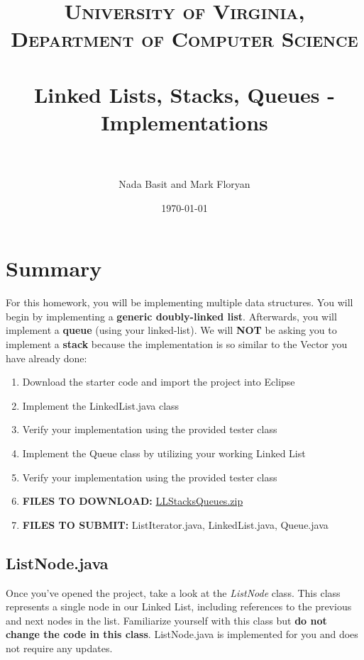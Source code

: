 \documentclass[paper=a4, fontsize=11pt, parskip=full]{scrartcl} %
\title{
\normalfont \normalsize
\textsc{University of Virginia, Department of Computer Science} \\ [25pt] %
\horrule{0.5pt} \\[0.4cm] %
\huge Linked Lists, Stacks, Queues - Implementations \\ %
\horrule{2pt} \\[0.5cm] %
}
\author{Nada Basit and Mark Floryan}
\date{\normalsize\today} %
\numberwithin{equation}{section} %
\numberwithin{figure}{section} %
\numberwithin{table}{section} %
\begin{document}
\maketitle %


\section{Summary}

For this homework, you will be implementing multiple data structures. You will begin by implementing a \textbf{generic doubly-linked list}. Afterwards, you will implement a \textbf{queue} (using your linked-list). We will \textbf{NOT} be asking you to implement a \textbf{stack} because the implementation is so similar to the Vector you have already done:

\begin{enumerate}
	\item Download the starter code and import the project into Eclipse
	\item Implement the LinkedList.java class
	\item Verify your implementation using the provided tester class
	\item Implement the Queue class by utilizing your working Linked List
	\item Verify your implementation using the provided tester class
	\item \textbf{FILES TO DOWNLOAD:} \href{https://uva-cs.github.io/dsa1/homeworks/LLStacksQueues/code/LLStacksQueues.zip}{LLStacksQueues.zip}
	\item \textbf{FILES TO SUBMIT:} ListIterator.java, LinkedList.java, Queue.java
\end{enumerate}


\subsection{ListNode.java}

Once you've opened the project, take a look at the \emph{ListNode} class. This class represents a single node in our Linked List, including references to the previous and next nodes in the list. Familiarize yourself with this class but \textbf{do not change the code in this class}. ListNode.java is implemented for you and does not require any updates.
\end{document}
